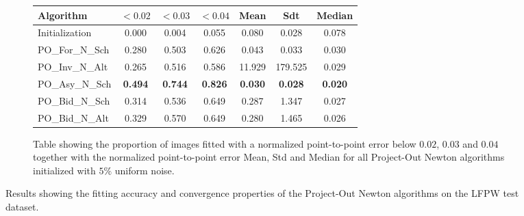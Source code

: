 \begin{figure}[p]
\begin{subfigure}{0.48\textwidth}
	    \label{fig:mean_cost_vs_iters2_bpo_n_5}
	\end{subfigure}
	\par\bigskip\bigskip
	\begin{subfigure}{\textwidth}
		\center
		\begin{tabular}{lcccccc}
		    \toprule
		    Algorithm & $<0.02$ & $<0.03$ & $<0.04$ & Mean & Sdt & Median 
		    \\
		    \midrule
		    Initialization & 0.000 & 0.004 & 0.055 & 0.080 & 0.028 & 0.078
		    \\ 
		    PO\_For\_N\_Sch & 0.280 & 0.503 & 0.626 & 0.043 & 0.033 & 0.030
		    \\
		    PO\_Inv\_N\_Alt & 0.265 & 0.516 & 0.586 & 11.929 & 179.525 & 0.029
		    \\
		    PO\_Asy\_N\_Sch & \textbf{0.494} & \textbf{0.744} & \textbf{0.826} & \textbf{0.030} & \textbf{0.028} & \textbf{0.020}
		    \\
		    PO\_Bid\_N\_Sch & 0.314 & 0.536 & 0.649 & 0.287 & 1.347 & 0.027
		    \\
		    PO\_Bid\_N\_Alt & 0.329 & 0.570 & 0.649 & 0.280 & 1.465 & 0.026
		    \\
		    \bottomrule
	  	\end{tabular}
	  	\caption{Table showing the proportion of images fitted with a normalized point-to-point error below $0.02$, $0.03$ and $0.04$ together with the normalized point-to-point error Mean, Std and Median for all Project-Out Newton algorithms initialized with $5\%$ uniform noise.}
	    \label{tab:stats_bpo_n_5}
	\end{subfigure}
	\caption{Results showing the fitting accuracy and convergence properties of the Project-Out Newton algorithms on the LFPW test dataset.}
	\label{fig:bpo_n_5}
\end{figure}


